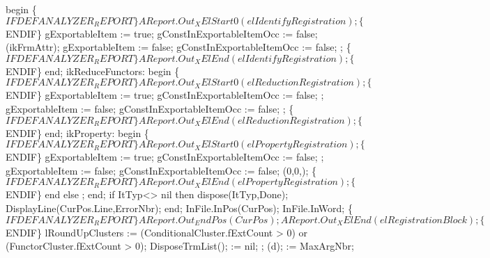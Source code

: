             begin
               \{$IFDEF ANALYZER_REPORT\}
               AReport.Out_XElStart0(elIdentifyRegistration);
               \{$ENDIF\}
               gExportableItem := true;
               gConstInExportableItemOcc := false;
               (ikFrmAttr);
               gExportableItem := false;
               gConstInExportableItemOcc := false;
               ;
               \{$IFDEF ANALYZER_REPORT\}
               AReport.Out_XElEnd(elIdentifyRegistration);
               \{$ENDIF\}
            end;
         ikReduceFunctors:
            begin
               \{$IFDEF ANALYZER_REPORT\}
               AReport.Out_XElStart0(elReductionRegistration);
               \{$ENDIF\}
               gExportableItem := true;
               gConstInExportableItemOcc := false;
               ;
               gExportableItem := false;
               gConstInExportableItemOcc := false;
               ;
               \{$IFDEF ANALYZER_REPORT\}
               AReport.Out_XElEnd(elReductionRegistration);
               \{$ENDIF\}
            end;
         ikProperty:
            begin
               \{$IFDEF ANALYZER_REPORT\}
               AReport.Out_XElStart0(elPropertyRegistration);
               \{$ENDIF\}
               gExportableItem := true;
               gConstInExportableItemOcc := false;
               ;
               gExportableItem := false;
               gConstInExportableItemOcc := false;
               (0,0,);
               \{$IFDEF ANALYZER_REPORT\}
               AReport.Out_XElEnd(elPropertyRegistration);
               \{$ENDIF\}
            end
      else ;
      end;
      if ItTyp<> nil then dispose(ItTyp,Done);
      DisplayLine(CurPos.Line,ErrorNbr);
   end;
   InFile.InPos(CurPos); InFile.InWord;
   \{$IFDEF ANALYZER_REPORT\}
   AReport.Out_EndPos(CurPos);
   AReport.Out_XElEnd(elRegistrationBlock);
   \{$ENDIF\}
   lRoundUpClusters := (ConditionalCluster.fExtCount > 0)
      or (FunctorCluster.fExtCount > 0);
   DisposeTrmList();  := nil;
   ;
   (d);
    := MaxArgNbr;
